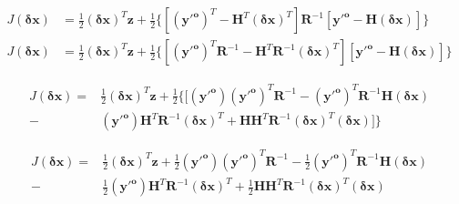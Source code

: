 
\begin{align}
\label{apII_eq:4}
J(\mathbf{\delta{x}}) & = \frac{1}{2}(\mathbf{\delta{x}})^{T}\mathbf{z} + 
\frac{1}{2} \lbrace [(\mathbf{y'^o})^{T} - \mathbf{H}^{T}(\mathbf{\delta{x}})^{T}] \mathbf{R}^{-1}[\mathbf{y'^o} - \mathbf{H}(\mathbf{\delta{x}})] \rbrace \\
\label{apII_eq:5}
J(\mathbf{\delta{x}}) & = \frac{1}{2}(\mathbf{\delta{x}})^{T}\mathbf{z} + 
\frac{1}{2} \lbrace [(\mathbf{y'^o})^{T}\mathbf{R}^{-1} - \mathbf{H}^{T}\mathbf{R}^{-1}(\mathbf{\delta{x}})^{T}] [\mathbf{y'^o} - \mathbf{H}(\mathbf{\delta{x}})] \rbrace
\end{align}

\begin{equation}
\label{apII_eq:6}
\begin{aligned}
J(\mathbf{\delta{x}}) = {} & \frac{1}{2}(\mathbf{\delta{x}})^{T}\mathbf{z} + 
\frac{1}{2}
\lbrace [
(\mathbf{y'^o})(\mathbf{y'^o})^{T}\mathbf{R}^{-1} -
(\mathbf{y'^o})^{T}\mathbf{R}^{-1}\mathbf{H}(\mathbf{\delta{x}}) \\ - 
& (\mathbf{y'^o})\mathbf{H}^{T}\mathbf{R}^{-1}(\mathbf{\delta{x}})^{T} +
\mathbf{H}\mathbf{H}^{T}\mathbf{R}^{-1}(\mathbf{\delta{x}})^{T}(\mathbf{\delta{x}})
] \rbrace
\end{aligned}
\end{equation}

\begin{equation}
\label{apII_eq:7}
  \begin{aligned}
J(\mathbf{\delta{x}}) = {} & \frac{1}{2}(\mathbf{\delta{x}})^{T}\mathbf{z} + 
\frac{1}{2}(\mathbf{y'^o})(\mathbf{y'^o})^{T}\mathbf{R}^{-1} -
\frac{1}{2}(\mathbf{y'^o})^{T}\mathbf{R}^{-1}\mathbf{H}(\mathbf{\delta{x}}) \\ - 
& \frac{1}{2}(\mathbf{y'^o})\mathbf{H}^{T}\mathbf{R}^{-1}(\mathbf{\delta{x}})^{T} +
\frac{1}{2}\mathbf{H}\mathbf{H}^{T}\mathbf{R}^{-1}(\mathbf{\delta{x}})^{T}(\mathbf{\delta{x}})
  \end{aligned}
\end{equation}

